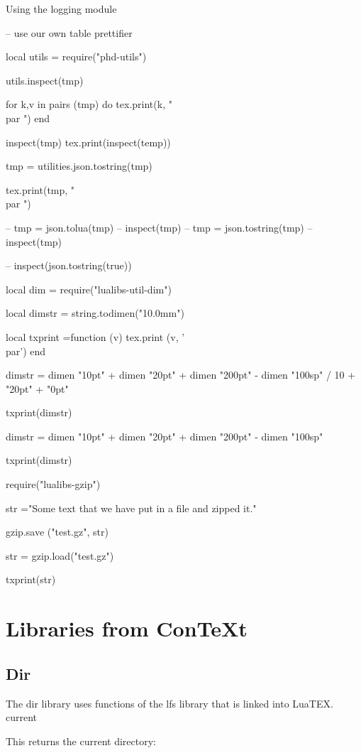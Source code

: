 \begin{texexample}{Using the logging module}{}
\begin{luacode}
 
 -- use our own table prettifier
 
 local utils = require("phd-utils")
 
 utils.inspect(tmp)
 
 for k,v in pairs (tmp) do
    tex.print(k, " \\par ")
 end
 
inspect(tmp)
tex.print(inspect(temp))

tmp = utilities.json.tostring(tmp)

tex.print(tmp, " \\par ")


-- tmp = json.tolua(tmp)
-- inspect(tmp)
-- tmp = json.tostring(tmp)
-- inspect(tmp)

-- inspect(json.tostring(true))


local dim =   require("lualibs-util-dim")

local dimstr = string.todimen("10.0mm")

local txprint =function (v)
     				tex.print (v, '\\par')
                  end

dimstr = dimen "10pt" + dimen "20pt" + dimen "200pt" - dimen "100sp" / 10 + "20pt" + "0pt"

txprint(dimstr)

dimstr = dimen "10pt" + dimen "20pt" + dimen "200pt" - dimen "100sp" 

txprint(dimstr)

require("lualibs-gzip") 

str ="Some text that we have put in a file and zipped it."

gzip.save ("test.gz", str)

str  = gzip.load("test.gz")


txprint(str)
\end{luacode}

\end{texexample}

\section{Libraries from ConTeXt}


\subsection*{Dir}

The dir library uses functions of the lfs library that is linked into LuaTEX.
current

This returns the current directory:

